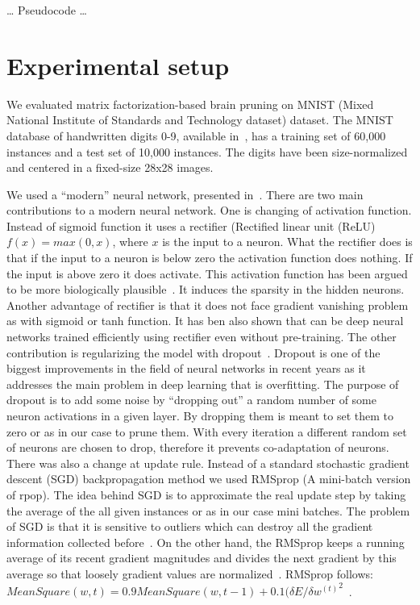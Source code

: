 \documentclass{article} %
\begin{document}
… Pseudocode …

\section{Experimental setup}
We evaluated matrix factorization-based brain pruning on MNIST (Mixed National 
Institute of Standards and Technology dataset) dataset. The MNIST database of 
handwritten digits 0-9, available in~\cite{lecun-mnisthandwrittendigit-2010}, 
has a training set of 60,000 instances and a test set of 10,000 instances. The 
digits have been size-normalized and centered in a fixed-size 28x28 images. 

We used a “modern” neural network, presented in~\cite{github}. There are two 
main contributions to a modern neural network. One is changing of activation 
function. Instead of sigmoid function it uses a rectifier (Rectified linear unit 
(ReLU) $f(x) = max(0, x)$, where $x$ is the input to a neuron. What the 
rectifier does is that if the input to a neuron is below zero the activation 
function does nothing. If the input is above zero it does activate. This 
activation function has been argued to be more biologically 
plausible~\cite{AISTATS2011_GlorotBB11}. It induces the sparsity in the hidden 
neurons. Another advantage of rectifier is that it does not face gradient 
vanishing problem as with sigmoid or tanh function. It has ben also shown that 
can be deep neural networks trained efficiently using rectifier even without 
pre-training. The other contribution is regularizing the model with 
dropout~\cite{srivastava2014dropout}. Dropout is one of the biggest improvements 
in the field of neural networks in recent years as it addresses the main problem 
in deep learning that is overfitting. The purpose of dropout is to add some 
noise by “dropping out” a random number of some neuron activations in a given 
layer. By dropping them is meant to set them to zero or as in our case to prune 
them. With every iteration a different random set of neurons are chosen to drop, 
therefore it prevents co-adaptation of neurons. 
There was also a change at update rule. Instead of a standard stochastic 
gradient descent (SGD) backpropagation method we used RMSprop (A mini-batch 
version of rpop). The idea behind SGD is to approximate the real update step by 
taking the average of the all given instances or as in our case mini batches. 
The problem of SGD is that it is sensitive to outliers which can destroy all the 
gradient information collected before~\cite{erogol}. On the other hand, the 
RMSprop keeps a running average of its recent gradient magnitudes and divides 
the next gradient by this average so that loosely gradient values are 
normalized~\cite{lecture}. RMSprop follows: 
$MeanSquare(w, t) = 0.9 MeanSquare(w, t-1) + 0.1 {({\delta E}/{\delta 
w^{(t)}}}^2$~\cite{lecture}.
\end{document}
